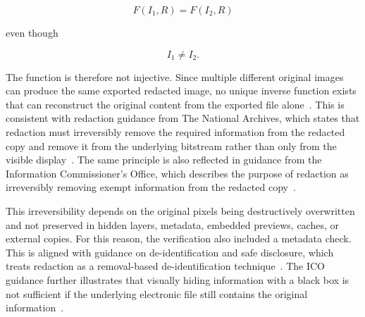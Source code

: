\[
F(I_1,R) = F(I_2,R)
\]

even though

\[
I_1 \neq I_2.
\]

The function is therefore not injective. Since multiple different original images can produce the same exported redacted image, no unique inverse function exists that can reconstruct the original content from the exported file alone~\cite{rosen2019discrete}. This is consistent with redaction guidance from The National Archives, which states that redaction must irreversibly remove the required information from the redacted copy and remove it from the underlying bitstream rather than only from the visible display~\cite{nationalarchives_redaction_toolkit}. The same principle is also reflected in guidance from the Information Commissioner's Office, which describes the purpose of redaction as irreversibly removing exempt information from the redacted copy~\cite{ico_disclose_safely}.

This irreversibility depends on the original pixels being destructively overwritten and not preserved in hidden layers, metadata, embedded previews, caches, or external copies. For this reason, the verification also included a metadata check. This is aligned with guidance on de-identification and safe disclosure, which treats redaction as a removal-based de-identification technique~\cite{nist800188}. The ICO guidance further illustrates that visually hiding information with a black box is not sufficient if the underlying electronic file still contains the original information~\cite{ico_disclose_safely}.

